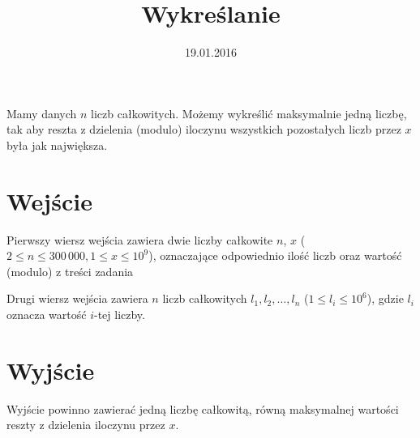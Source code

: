 \documentclass[zad,zawodnik,utf8]{sinol}
\title{Wykreślanie}
\author{} %
\date{19.01.2016}
\begin{document}
\begin{tasktext}%
Mamy danych $n$ liczb całkowitych. Możemy wykreślić maksymalnie jedną liczbę, tak aby reszta z dzielenia (modulo) iloczynu wszystkich pozostałych liczb przez $x$ była jak największa.

  \section{Wejście}
Pierwszy wiersz wejścia zawiera dwie liczby całkowite $n$, $x$ ($2 \leq n \leq 300\,000, 1 \leq x \leq 10^9$), oznaczające odpowiednio
ilość liczb oraz wartość (modulo) z treści zadania

Drugi wiersz wejścia zawiera $n$ liczb całkowitych $l_1, l_2, \ldots, l_n$ ($1 \leq l_i \leq 10^6$), gdzie $l_i$ oznacza wartość $i$-tej liczby.
  \section{Wyjście}
  Wyjście powinno zawierać jedną liczbę całkowitą, równą maksymalnej wartości reszty z dzielenia iloczynu przez $x$.
  \makecompactexample

\end{tasktext}
\end{document}
